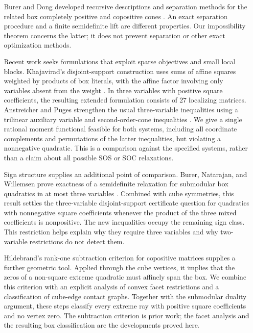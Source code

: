 Burer and Dong developed recursive descriptions and separation methods
for the related box completely positive and copositive cones
\citep{BurerDong2013}. An exact separation procedure and a finite
semidefinite lift are different properties. Our impossibility theorem
concerns the latter; it does not prevent separation or other exact
optimization methods.

Recent work seeks formulations that exploit sparse objectives and small
local blocks. Khajavirad's disjoint-support construction uses sums of
affine squares weighted by products of box literals, with the affine
factor involving only variables absent from the weight
\citep{Khajavirad2026SparseBoxQP}. In three variables with positive square
coefficients, the resulting extended formulation consists of $27$
localizing matrices. Anstreicher and Puges strengthen the usual
three-variable inequalities using a trilinear auxiliary variable and
second-order-cone inequalities \citep{AnstreicherPuges2025ETRI}. We give a
single rational moment functional feasible for both systems, including all
coordinate complements and permutations of the latter inequalities, but
violating a nonnegative quadratic. This is a comparison against the
specified systems, rather than a claim about all possible SOS or SOC
relaxations.

Sign structure supplies an additional point of comparison.
Burer, Natarajan, and Willemsen prove exactness of a semidefinite
relaxation for submodular box quadratics in at most three variables
\citep{BurerNatarajanWillemsen2025}. Combined with cube symmetries, this
result settles the three-variable disjoint-support certificate question
for quadratics with nonnegative square coefficients whenever the product
of the three mixed coefficients is nonpositive.
The new inequalities occupy the remaining sign class. This restriction
helps explain why they require three variables and why two-variable
restrictions do not detect them.

Hildebrand's rank-one subtraction criterion for copositive matrices
\citep{Hildebrand2014MinimalZeros} supplies a further geometric tool.
Applied through the cube vertices, it implies that the zeros of a
non-square extreme quadratic must affinely span the box. We combine this
criterion with an explicit analysis of convex facet restrictions and a
classification of cube-edge contact graphs. Together with the submodular
duality argument, these steps classify every extreme ray with positive
square coefficients and no vertex zero. The subtraction criterion is
prior work; the facet analysis and the resulting box classification are
the developments proved here.

